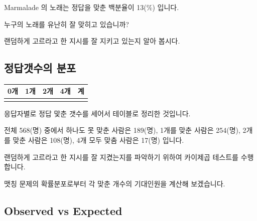 \documentclass[
]{book}
\begin{document}
Marmalade 의 노래는 정답을 맞춘 백분율이 13(\%) 입니다.

누구의 노래를 유난히 잘 맞히고 있습니까?

랜덤하게 고르라고 한 지시를 잘 지키고 있는지 알아 봅시다.

\subsection{정답갯수의 분포}\label{uxc815uxb2f5uxac2fuxc218uxc758-uxbd84uxd3ec-1}

\begin{longtable}[]{@{}
  >{\centering\arraybackslash}p{}
  >{\centering\arraybackslash}p{}
  >{\centering\arraybackslash}p{}
  >{\centering\arraybackslash}p{}
  >{\centering\arraybackslash}p{}@{}}
\toprule\noalign{}
\begin{minipage}[b]{\linewidth}\centering
0개
\end{minipage} & \begin{minipage}[b]{\linewidth}\centering
1개
\end{minipage} & \begin{minipage}[b]{\linewidth}\centering
2개
\end{minipage} & \begin{minipage}[b]{\linewidth}\centering
4개
\end{minipage} & \begin{minipage}[b]{\linewidth}\centering
계
\end{minipage} \\
\midrule\noalign{}
\endhead
\bottomrule\noalign{}
\endlastfoot
189 & 254 & 108 & 17 & 568 \\
\end{longtable}

응답자별로 정답 맟춘 갯수를 세어서 테이블로 정리한 것입니다.

전체 568(명) 중에서 하나도 못 맞춘 사람은 189(명), 1개를 맞춘 사람은 254(명), 2개를 맞춘 사람은 108(명), 4개 모두 맞춤 사람은 17(명) 입니다.

랜덤하게 고르라고 한 지시를 잘 지켰는지를 파악하기 위하여 카이제곱 테스트를 수행합니다.

맷칭 문제의 확률분포로부터 각 맞춘 개수의 기대인원을 계산해 보겠습니다.

\subsection{Observed vs Expected}\label{observed-vs-expected-1}
\end{document}
